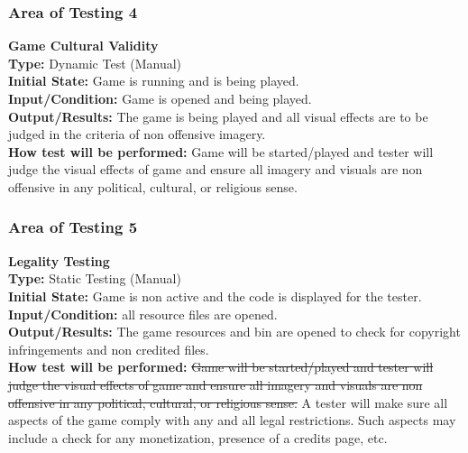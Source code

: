 \documentclass[12pt, titlepage]{article}
\begin{document}
\subsubsection{Area of Testing 4}
\noindent \textbf{Game Cultural Validity}\\ 
\textbf{Type:} Dynamic Test (Manual) \\
\textbf{Initial State:} Game is running and is being played. \\
\textbf{Input/Condition:} Game is opened and being played. \\
\textbf{Output/Results:} The game is being played and all visual effects are to be judged in the criteria of non offensive imagery. \\
\textbf{How test will be performed:} Game will be started/played and tester will judge the visual effects of game and ensure all imagery and visuals are non offensive in any political, cultural, or religious sense.

\subsubsection{Area of Testing 5}
\noindent \textbf{Legality Testing}\\
\textbf{Type:} Static Testing (Manual)\\
\textbf{Initial State:} Game is non active and the code is displayed for the tester.
\textbf{Input/Condition:} all resource files are opened. \\
\textbf{Output/Results:} The game resources and bin are opened to check for copyright infringements and non credited files.\\
\textbf{How test will be performed:} \sout{Game will be started/played and tester will judge the visual effects of game and ensure all imagery and visuals are non offensive in any political, cultural, or religious sense.} {\color{blue} A tester will make sure all aspects of the game comply with any and all legal restrictions. Such aspects may include a check for any monetization, presence of a credits page, etc.}
\end{document}
